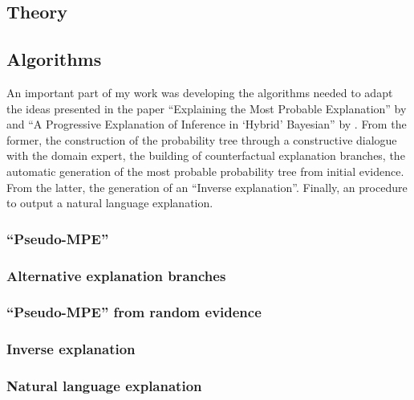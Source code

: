 \subsection{Theory}


\subsection{Algorithms}
An important part of my work was developing the algorithms needed to adapt the ideas presented in the paper \enquote{Explaining the Most Probable Explanation} by \cite{Butz2018} and \enquote{A Progressive Explanation of Inference in \enquote{Hybrid} Bayesian} by \cite{Kyrimi2016}.
From the former, the construction of the probability tree through a constructive dialogue with the domain expert, the building of counterfactual explanation branches, the automatic generation of the most probable probability tree from initial evidence.
From the latter, the generation of an \enquote{Inverse explanation}.
Finally, an procedure to output a natural language explanation.

\subsubsection{\enquote{Pseudo-MPE}}


\subsubsection{Alternative explanation branches}

\subsubsection{\enquote{Pseudo-MPE} from random evidence}

\subsubsection{Inverse explanation}

\subsubsection{Natural language explanation}

